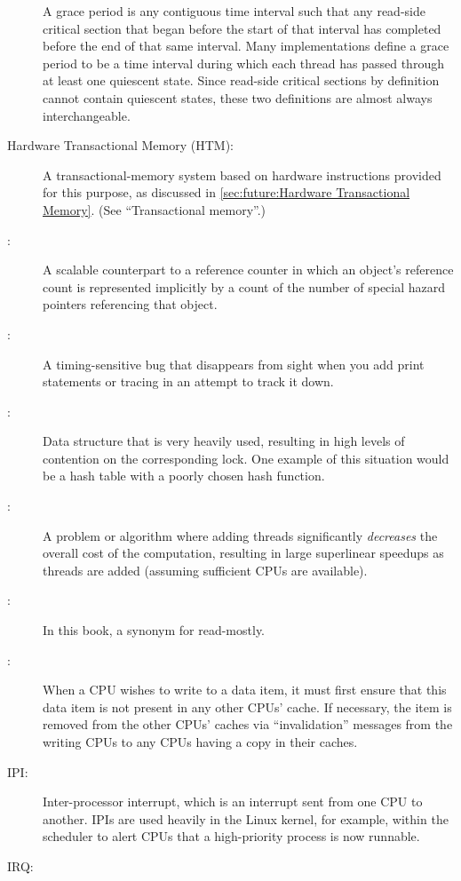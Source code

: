 \begin{description}
	A grace period is any contiguous time interval such that
	any  read-side critical section that began before the
	start of that interval has
	completed before the end of that same interval.
	Many  implementations define a grace period to be a
	time interval during which each thread has passed through at
	least one quiescent state.
	Since  read-side critical sections by definition cannot
	contain quiescent states, these two definitions are almost
	always interchangeable.
\item[Hardware Transactional Memory (HTM):]
	A transactional-memory system based on hardware instructions
	provided for this purpose, as discussed in
	\cref{sec:future:Hardware Transactional Memory}.
	(See ``Transactional memory''.)
\item[\IXG{Hazard Pointer}:]
	A scalable counterpart to a reference counter in which an
	object's reference count is represented implicitly by a count
	of the number of special hazard pointers referencing that object.
\item[\IXG{Heisenbug}:]
	A timing-sensitive bug that disappears from sight when you
	add print statements or tracing in an attempt to track it
	down.
\item[\IXG{Hot Spot}:]
	Data structure that is very heavily used, resulting in high
	levels of contention on the corresponding lock.
	One example of this situation would be a hash table with
	a poorly chosen hash function.
\item[\IXG{Humiliatingly Parallel}:]
	A problem or algorithm where adding threads significantly
	\emph{decreases} the overall cost of the computation, resulting in
	large superlinear speedups as threads are added (assuming sufficient
	CPUs are available).
\item[\IXG{Immutable}:]
	In this book, a synonym for read-mostly.
\item[\IXG{Invalidation}:]
	When a CPU wishes to write to a data item, it must first ensure
	that this data item is not present in any other CPUs' cache.
	If necessary, the item is removed from the other CPUs' caches
	via ``invalidation'' messages from the writing CPUs to any
	CPUs having a copy in their caches.
\item[IPI:]
	Inter-processor interrupt, which is an
	interrupt sent from one CPU to another.
	IPIs are used heavily in the Linux kernel, for example, within
	the scheduler to alert CPUs that a high-priority process is now
	runnable.
\item[IRQ:]

\end{description}
